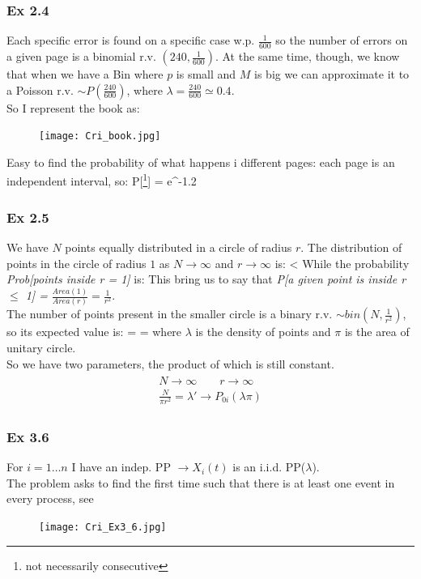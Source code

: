 	\subsubsection*{Ex 2.4}
	Each specific error is found on a specific case w.p. $\frac{1}{600}$ so the number of errors on a given page is a binomial r.v. $(240,\frac{1}{600})$. At the same time, though, we know that when we have a Bin where $p$ is small and $M$ is big we can approximate it to a Poisson r.v. $\sim P(\frac{240}{600})$, where $\lambda = \frac{240}{600}  \simeq 0.4$.\\
	So I represent the book as:
	\begin{figure}[h]
	\centering
	\texttt{[image: Cri\_book.jpg]}
	\label{fig:book}
	\end{figure}
	Easy to find the probability of what happens i different pages: each page is an independent interval, so:
	\beq
	P[\footnote{not necessarily consecutive}] = e^{-1.2}
	\eeq
	\subsubsection*{Ex 2.5}
	We have $N$ points equally distributed in a circle of radius $r$. The distribution of points in the circle of radius $1$ as $N \to \infty$ and $r \to \infty$ is:
	\beq
	 < \lambda
	\eeq
	While the probability \textit{Prob[points inside r = 1]} is:
	\beq
	\eeq
	This bring us to say that \textit{P[a given point is inside r $\leq$ 1] = } $\frac{Area(1)}{Area(r)} = \frac{1}{r^2}$.\\
	The number of points present in the smaller circle is a binary r.v. $\sim bin(N,\frac{1}{r^2})$, so its expected value is:
	\beq
	 =  = \lambda\pi
	\eeq
	where $\lambda$ is the density of points and $\pi$ is the area of unitary circle.\\
	So we have two parameters, the product of which is still constant.
	\begin{align}
	\begin{split}
	N \to \infty \qquad r \to \infty\\
	\frac{N}{\pi r^2} = \lambda' \rightarrow P_{0i}(\lambda\pi)
	\end{split}
	\end{align}
	\subsubsection*{Ex 3.6}
	For $i = 1 \dots n$ I have an indep. PP $\rightarrow X_i(t)$ is an i.i.d. PP($\lambda$).\\
	The problem asks to find the first time such that there is at least one event  in every process, see 
	\begin{figure}[h]
		\centering
		\texttt{[image: Cri\_Ex3\_6.jpg]}
		\label{fig:renewal_ex}
	\end{figure}

